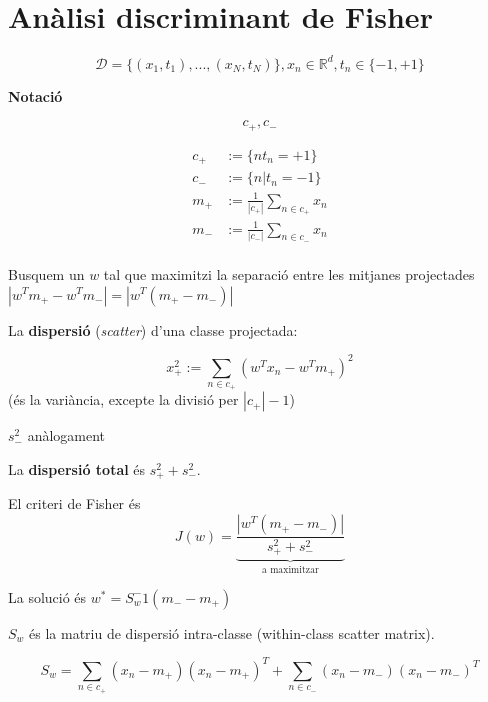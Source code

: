 \documentclass[a4paper]{article}
\begin{document}
	\section{Anàlisi discriminant de Fisher}
	$$  \mathcal{D} = \{(x_1, t_1), ..., (x_N, t_N)\}, x_n \in \mathbb{R}^d, t_n \in \{-1, +1 \}  $$
	
	
	\textbf{Notació}
	
	$$  c_+, c_-  $$
	
	\begin{equation}
		\begin{aligned}
			c_+ &:= \{ n  t_n = +1 \} \\
			c_- &:= \{ n | t_n = -1 \} \\
			m_+ &:= \frac{1}{|c_+|} \sum_{n\in c_+} x_n \\
			m_- &:= \frac{1}{|c_-|} \sum_{n\in c_-} x_n \\
		\end{aligned}
	\end{equation}
	
	Busquem un $w$ tal que maximitzi la separació entre les mitjanes projectades $|w^Tm_+ - w^Tm_-| = |w^T(m_+ - m_-)|$
	
	La \textbf{dispersió} (\emph{scatter}) d'una classe projectada:
	
	$$  x_+^2 := \sum_{n \in c_+} (w^Tx_n - w^Tm_+)^2  $$
	(és la variància, excepte la divisió per $|c_+| - 1$)

	$s_-^2$ anàlogament
	
	La \textbf{dispersió total} és $s_+^2 + s_-^2$.
	
	El criteri de Fisher és $$  J(w) = \underbrace{\frac{|w^T(m_+-m_-)|}{s_+^2 + s_-^2}}_\text{a maximitzar}  $$
	
	La solució és $w^* = S_w^-1(m_- - m_+)$
	
	$S_w$ és la matriu de dispersió intra-classe (within-class scatter matrix).
	
	$$  S_w = \sum_{n \in c_+} (x_n - m_+)(x_n - m_+)^T + \sum_{n \in c_-} (x_n - m_-)(x_n - m_-)^T  $$
	
\end{document}

